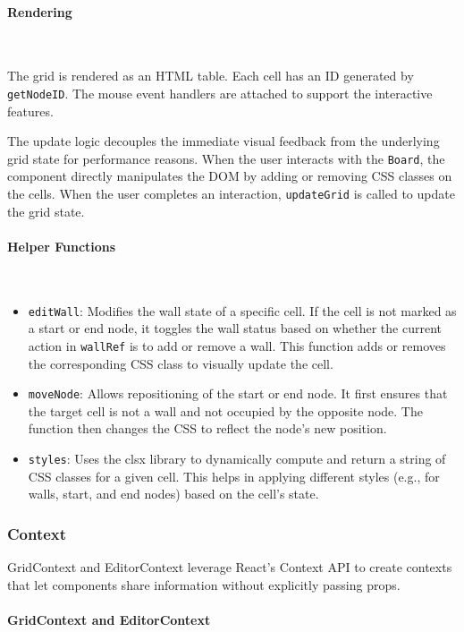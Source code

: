 \paragraph{Rendering} \

The grid is rendered as an HTML table. Each cell has an ID generated by \texttt{getNodeID}. The mouse event handlers are attached to support the interactive features.

The update logic decouples the immediate visual feedback from the underlying grid state for performance reasons. When the user interacts with the \texttt{Board}, the component directly manipulates the DOM by adding or removing CSS classes on the cells. When the user completes an interaction, \texttt{updateGrid} is called to update the grid state.

\paragraph{Helper Functions} \

\begin{itemize}
    \item \texttt{editWall}: Modifies the wall state of a specific cell. If the cell is not marked as a start or end node, it toggles the wall status based on whether the current action in \texttt{wallRef} is to add or remove a wall. This function adds or removes the corresponding CSS class to visually update the cell.
    \item \texttt{moveNode}: Allows repositioning of the start or end node. It first ensures that the target cell is not a wall and not occupied by the opposite node. The function then changes the CSS to reflect the node’s new position.
    \item \texttt{styles}: Uses the clsx library to dynamically compute and return a string of CSS classes for a given cell. This helps in applying different styles (e.g., for walls, start, and end nodes) based on the cell’s state.
\end{itemize}

\subsubsection{Context}

GridContext and EditorContext leverage React's Context API to create contexts that let components share information without explicitly passing props.

\paragraph{GridContext and EditorContext} \

